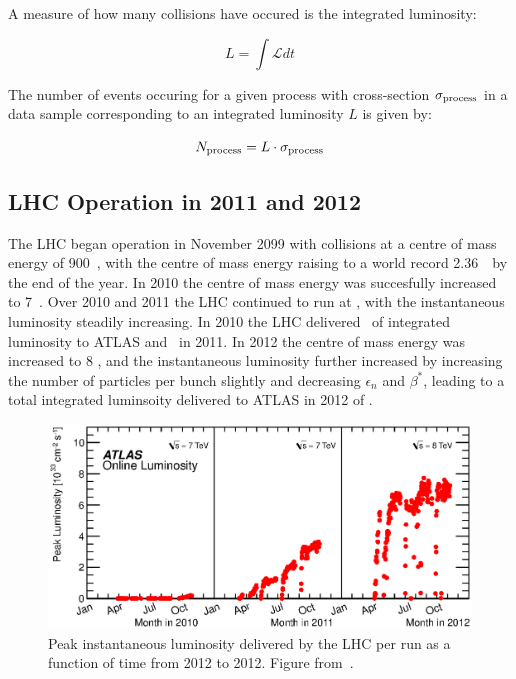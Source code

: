 A measure of how many collisions have occured is the integrated luminosity:

\begin{equation}
L = \int \mathcal{L} dt
\end{equation}

The number of events occuring for a given process with cross-section
$\sigma_{\rm{process}}$ in a data sample corresponding to an integrated
luminosity $L$ is given by:

\begin{equation}
N_{\rm{process}} = L \cdot \sigma_{\rm{process}}
\end{equation}

\subsection{LHC Operation in 2011 and 2012}
\label{sec-lhc-operation}

The LHC began operation in November 2099 with collisions at a centre of mass
energy of 900~\GeV, with the centre of mass energy raising to a world record
2.36~\TeV\ by the end of the year. In 2010 the centre of mass energy was
succesfully increased to 7~\TeV. Over 2010 and 2011 the LHC continued to run at
, with the instantaneous luminosity steadily increasing. In 2010 the
LHC delivered \LumiTotalDeliveredTwentyTen\ of integrated luminosity to ATLAS and
\LumiTotalDeliveredTwentyEleven\ in 2011. In 2012 the centre of mass energy was
increased to 8 \tev, and the instantaneous luminosity further increased by
increasing the number of particles per bunch slightly and decreasing
$\epsilon_{n}$ and $\beta^{*}$, leading to a total integrated luminsoity
delivered to ATLAS in 2012 of \LumiTotalDeliveredTwentyTwelve. 

\begin{figure}[h]
\centering
            \includegraphics[width=\textwidth]{lumivstime}
\caption{Peak instantaneous luminosity delivered by the LHC per run as a function of time from
2012 to 2012. Figure from~\cite{atlaslumipublic}.}
\label{fig:lhc-inst-lumi}
\end{figure}

